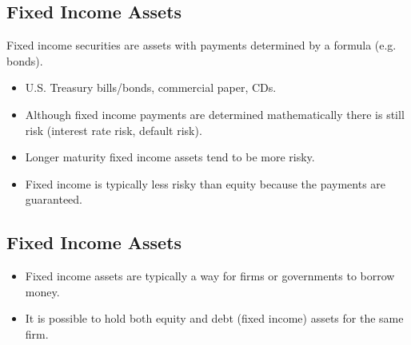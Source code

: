 \documentclass[letterpaper,10pt,english]{sphinxmanual}
\begin{document}
\subsection{Fixed Income Assets}
\label{assetClasses:fixed-income-assets}
Fixed income securities are assets with payments determined by a
formula (e.g. bonds).
\begin{itemize}
\item {} 
U.S. Treasury bills/bonds, commercial paper, CDs.

\end{itemize}
\begin{itemize}
\item {} 
Although fixed income payments are determined
mathematically there is still risk (interest rate risk, default
risk).

\end{itemize}
\begin{itemize}
\item {} 
Longer maturity fixed income assets tend to be more risky.

\end{itemize}
\begin{itemize}
\item {} 
Fixed income is typically less risky than equity because the
payments are guaranteed.

\end{itemize}


\subsection{Fixed Income Assets}
\label{assetClasses:id3}\begin{itemize}
\item {} 
Fixed income assets are typically a way for firms or governments to
borrow money.

\end{itemize}
\begin{itemize}
\item {} 
It is possible to hold both equity and debt (fixed income) assets
for the same firm.

\end{itemize}
\end{document}
